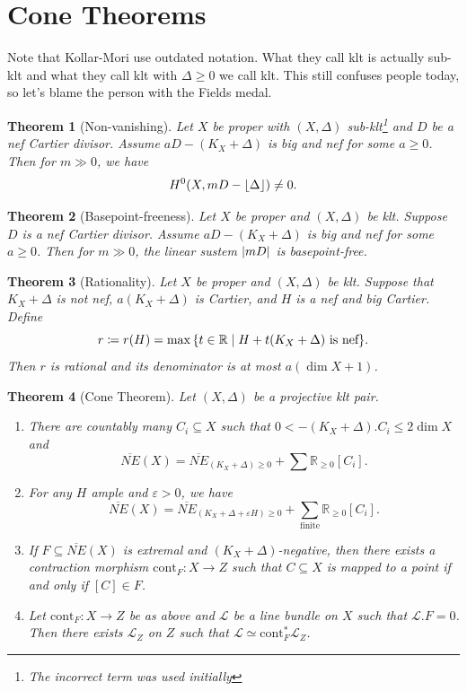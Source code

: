 \documentclass[leqno, openany]{memoir}
\DeclarePairedDelimiter{\floor}{\lfloor}{\rfloor}
\newtheorem{thm}{Theorem}[section]
\theoremstyle{definition}
\theoremstyle{remark}
\theoremstyle{plain}
\theoremstyle{definition}
\theoremstyle{remark}
\newcommand{\R}{\mathbb{R}}
\newcommand{\ep}{\varepsilon}
\newcommand{\mc}[1]{\mathcal{#1}}
\newcommand{\mr}[1]{\mathrm{#1}}
\newcommand{\ol}[1]{\overline{#1}}
\begin{document}
\section{Cone Theorems}%
\label{sec:cone_theorems}

Note that Kollar-Mori use outdated notation. What they call klt is actually sub-klt and what they call klt with $\Delta \geq 0$ we call klt. This still confuses people today, so let's blame the person with the Fields medal.

\begin{thm}[Non-vanishing]
    Let $X$ be proper with $(X, \Delta)$ sub-klt\footnote{The incorrect term was used initially} and $D$ be a nef Cartier divisor. Assume $aD - (K_X + \Delta)$ is big and nef for some $a \geq 0$. Then for $m \gg 0$, we have
    \[ H^0(X, mD - \floor{\Delta}) \neq 0. \]
\end{thm}

\begin{thm}[Basepoint-freeness]
    Let $X$ be proper and $(X, \Delta)$ be klt. Suppose $D$ is a nef Cartier divisor. Assume $aD - (K_X + \Delta)$ is big and nef for some $a \geq 0$. Then for $m \gg 0$, the linear sustem $\abs{mD}$ is basepoint-free.
\end{thm}

\begin{thm}[Rationality]
    Let $X$ be proper and $(X, \Delta)$ be klt. Suppose that $K_X + \Delta$ is not nef, $a(K_X + \Delta)$ is Cartier, and $H$ is a nef and big Cartier. Define
    \[ r \coloneqq r(H) = \max \qty{t \in \R \mid H + t(K_X + \Delta)\ \text{is nef}}. \]
    Then $r$ is rational and its denominator is at most $a(\dim X + 1)$.
\end{thm}

\begin{thm}[Cone Theorem]
    Let $(X, \Delta)$ be a projective klt pair. 
    \begin{enumerate}
        \item There are countably many $C_i \subseteq X$ such that $0 < - (K_X + \Delta) . C_i \leq 2 \dim X$ and
            \[ \ol{NE}(X) = \ol{NE}_{(K_X + \Delta) \geq 0} + \sum \R_{\geq 0} [C_i]. \]
        \item For any $H$ ample and $\ep > 0$, we have
            \[ \ol{NE}(X) = \ol{NE}_{(K_X + \Delta + \ep H) \geq 0} + \sum_{\text{finite}} \R_{\geq 0} [C_i]. \]
        \item If $F \subseteq \ol{NE}(X)$ is extremal and $(K_X + \Delta)$-negative, then there exists a contraction morphism $\mr{cont}_F \colon X \to Z$ such that $C \subseteq X$ is mapped to a point if and only if $[C] \in F$.
        \item Let $\mr{cont}_F \colon X \to Z$ be as above and $\mc{L}$ be a line bundle on $X$ such that $\mc{L}.F = 0$. Then there exists $\mc{L}_Z$ on $Z$ such that $\mc{L} \simeq \mr{cont}_F^* \mc{L}_Z$.
    \end{enumerate}
\end{thm}
\end{document}
